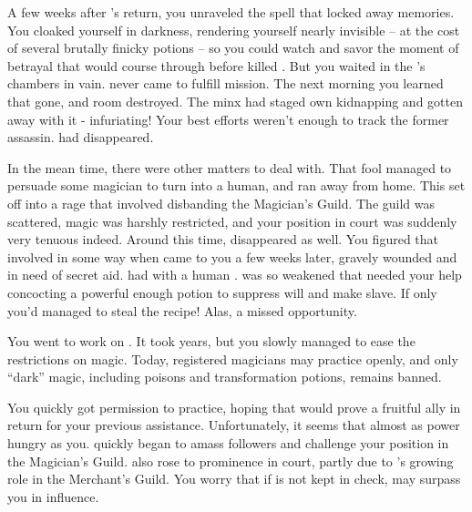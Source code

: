 \documentclass[char]{NeptuneBall}
\begin{document}
A few weeks after \cQueen{}'s return, you unraveled the spell that locked away \cQueen{\their} memories. You cloaked yourself in darkness, rendering yourself nearly invisible -- at the cost of several brutally finicky potions -- so you could watch and savor the moment of betrayal that would course through \cKing{} before \cQueen{} killed \cKing{\them}. But you waited in the \cKing{\King}'s chambers in vain. \cQueen{} never came to fulfill \cQueen{\their} mission. The next morning you learned that \cQueen{\they} \cQueen{\were} gone, and \cQueen{\their} room destroyed. The minx had staged \cQueen{\their} own kidnapping and gotten away with it - infuriating! Your best efforts weren't enough to track the former assassin. \cQueen{\They} had disappeared.

In the mean time, there were other matters to deal with. That fool \cAriel{} managed to persuade some magician to turn \cAriel{\them} into a human, and ran away from home. This set \cKing{} off into a rage that involved  \cKing{\them} disbanding the Magician's Guild. The guild was scattered, magic was harshly restricted, and your position in court was suddenly very tenuous indeed. Around this time, \cWitch{} disappeared as well. You figured that \cWitch{\they} \cWitch{\were} involved in some way when \cWitch{\they} came to you a few weeks later, gravely wounded and in need of secret aid. \cWitch{\They} had with \cWitch{\them} a human \cSlave{\prince}. \cWitch{} was so weakened that \cWitch{\they} needed your help concocting a powerful enough potion to suppress \cSlave{\their} will and make \cSlave{\them} \cWitch{\their} slave. If only you'd managed to steal the recipe! Alas, a missed opportunity.

You went to work on \cKing{}. It took years, but you slowly managed to ease the restrictions on magic. Today, registered magicians may practice openly, and only ``dark'' magic, including poisons and transformation potions, remains banned. 

You quickly got \cWitch{} permission to practice, hoping that \cWitch{\they} would prove a fruitful ally in return for your previous assistance. Unfortunately, it seems that \cWitch{\they} \cWitch{\are} almost as power hungry as you. \cWitch{\They} quickly began to amass followers and challenge your position in the Magician's Guild. \cWitch{} also rose to prominence in court, partly due to \cWitch{\their} \cSlave{\sibling}'s growing role in the Merchant's Guild. You worry that if \cWitch{} is not kept in check, \cWitch{\they} may surpass you in influence.
\end{document}
